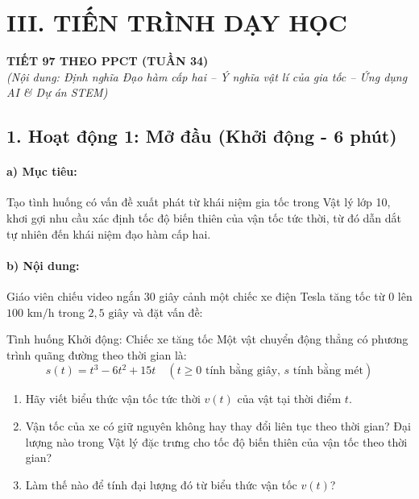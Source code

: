 \documentclass[12pt, a4paper]{article}
\begin{document}
\section*{III. TIẾN TRÌNH DẠY HỌC}

\begin{center}
    \textbf{\large TIẾT 97 THEO PPCT (TUẦN 34)}\\[4pt]
    \textit{(Nội dung: Định nghĩa Đạo hàm cấp hai -- Ý nghĩa vật lí của gia tốc -- Ứng dụng AI \& Dự án STEM)}
\end{center}

\subsection*{1. Hoạt động 1: Mở đầu (Khởi động - 6 phút)}

\paragraph{a) Mục tiêu:} Tạo tình huống có vấn đề xuất phát từ khái niệm gia tốc trong Vật lý lớp 10, khơi gợi nhu cầu xác định tốc độ biến thiên của vận tốc tức thời, từ đó dẫn dắt tự nhiên đến khái niệm đạo hàm cấp hai.

\paragraph{b) Nội dung:} Giáo viên chiếu video ngắn 30 giây cảnh một chiếc xe điện Tesla tăng tốc từ $0$ lên $100\text{ km/h}$ trong $2{,}5\text{ giây}$ và đặt vấn đề:
\begin{pedabox}{Tình huống Khởi động: Chiếc xe tăng tốc}
Một vật chuyển động thẳng có phương trình quãng đường theo thời gian là:
$$s(t) = t^3 - 6t^2 + 15t \quad (t \geq 0\text{ tính bằng giây, } s\text{ tính bằng mét})$$
\begin{enumerate}[leftmargin=0.6cm]
    \item Hãy viết biểu thức vận tốc tức thời $v(t)$ của vật tại thời điểm $t$.
    \item Vận tốc của xe có giữ nguyên không hay thay đổi liên tục theo thời gian? Đại lượng nào trong Vật lý đặc trưng cho tốc độ biến thiên của vận tốc theo thời gian?
    \item Làm thế nào để tính đại lượng đó từ biểu thức vận tốc $v(t)$?
\end{enumerate}
\end{pedabox}
\end{document}
